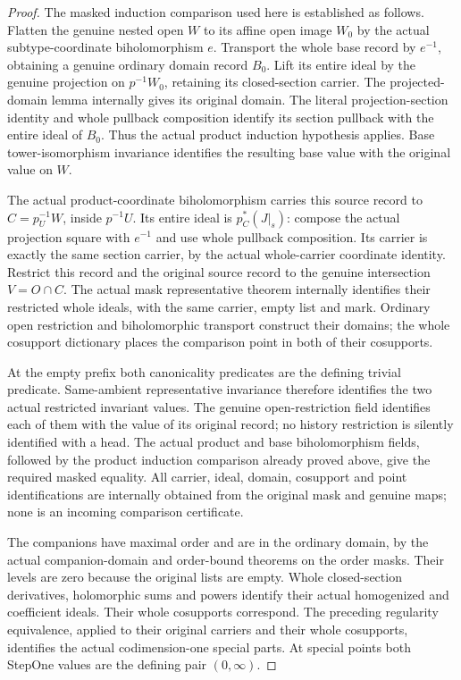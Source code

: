 \begin{proof}
The masked induction comparison used here is established as follows. 
Flatten the genuine nested open $W$ to its affine open image $W_0$ by the
actual subtype-coordinate biholomorphism $e$. Transport the whole base record
by $e^{-1}$, obtaining a genuine ordinary domain record $B_0$. Lift its entire
ideal by the genuine projection on $p^{-1}W_0$, retaining its closed-section
carrier. The projected-domain lemma internally gives its original domain.
The literal projection-section identity and whole pullback composition identify
its section pullback with the entire ideal of $B_0$. Thus the actual product
induction hypothesis applies. Base tower-isomorphism invariance identifies the
resulting base value with the original value on $W$.

The actual product-coordinate biholomorphism carries this source record to
$C=p_U^{-1}W$, inside $p^{-1}U$. Its entire ideal is $p_C^*(J|_s)$:
compose the actual projection square with $e^{-1}$ and use whole pullback
composition. Its carrier is exactly the same section carrier, by the actual
whole-carrier coordinate identity. Restrict this record and the original
source record to the genuine intersection $V=O\cap C$. The actual mask
representative theorem internally identifies their restricted whole ideals,
with the same carrier, empty list and mark. Ordinary open restriction and
biholomorphic transport construct their domains; the whole cosupport dictionary
places the comparison point in both of their cosupports.

At the empty prefix both canonicality predicates are the defining trivial
predicate. Same-ambient representative invariance therefore identifies the
two actual restricted invariant values. The genuine open-restriction field
identifies each of them with the value of its original record; no history
restriction is silently identified with a head. The actual product and base
biholomorphism fields, followed by the product induction comparison already
proved above, give the required masked equality. All carrier, ideal, domain,
cosupport and point identifications are internally obtained from the original
mask and genuine maps; none is an incoming comparison certificate.


The companions have maximal order and are in the ordinary domain, by the actual
companion-domain and order-bound theorems on the order masks. Their levels are
zero because the original lists are empty. Whole closed-section derivatives,
holomorphic sums and powers identify their actual homogenized and coefficient
ideals. Their whole cosupports correspond. The preceding regularity equivalence,
applied to their original carriers and their whole cosupports, identifies the
actual codimension-one special parts. At special points both StepOne values
are the defining pair $(0,\infty)$.


\end{proof}
